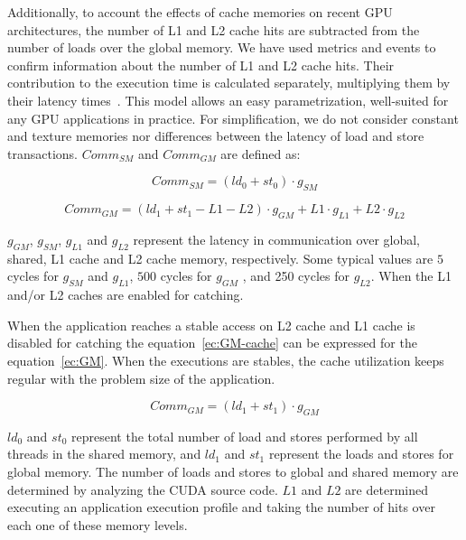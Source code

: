 Additionally, to account the effects of cache memories on recent GPU architectures, the number of L1 and L2 cache hits are subtracted from the number of loads over the global memory. We have used metrics and events to confirm information about the number of L1 and L2 cache hits. Their contribution to the execution time is calculated separately, multiplying them by their latency times~\citep{GPU:BenchMark, Bench:GPU}. This model allows an easy parametrization, well-suited for any GPU applications in practice. For simplification, we do not consider  constant and texture memories nor differences between the latency of load and store transactions. $Comm_{SM}$ and $Comm_{GM}$ are defined as:

\begin{equation}\label{ec:SM}
Comm_{SM} = \left(ld_{0} + st_{0} \right) \cdot g_{SM}
\end{equation}


\begin{equation}\label{ec:GM-cache}
Comm_{GM} = \left(ld_{1} + st_{1} - L1 - L2 \right) \cdot g_{GM} + L1\cdot g_{L1} + L2\cdot g_{L2} 
\end{equation}

$g_{GM}$, $g_{SM}$, $g_{L1}$ and $g_{L2}$ represent the latency in communication over global, shared, L1 cache and L2 cache memory, respectively. Some typical values are $5$ cycles for $g_{SM}$ and $g_{L1}$, $500$ cycles for $g_{GM}$ \citep{CUDA:Best}, and 250 cycles for $g_{L2}$. When the L1 and/or L2 caches are enabled for catching. 

When the application reaches a stable access on L2 cache and L1 cache is disabled for catching the equation~\ref{ec:GM-cache} can be expressed for the equation~\ref{ec:GM}. When the executions are stables, the cache utilization keeps regular with the problem size of the application. 

\begin{equation}\label{ec:GM}
Comm_{GM}  = \left(ld_{1} + st_{1} \right) \cdot g_{GM} 
\end{equation}

$ld_{0}$ and $st_{0}$ represent the total number of load and stores performed by all threads in the shared memory, and $ld_{1}$ and $st_{1}$ represent the loads and stores for global memory. The number of loads and stores to global and shared memory are determined by analyzing the CUDA source code. $L1$ and $L2$ are determined executing an application execution profile and taking the number of hits over each one of these memory levels. 

